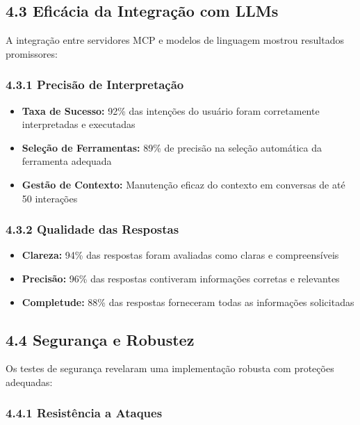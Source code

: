 \documentclass[
]{article}
\providecommand{\tightlist}{%
  \setlength{\itemsep}{0pt}\setlength{\parskip}{0pt}}
\begin{document}
\subsection{4.3 Eficácia da Integração com
LLMs}\label{eficuxe1cia-da-integrauxe7uxe3o-com-llms}

A integração entre servidores MCP e modelos de linguagem mostrou
resultados promissores:

\subsubsection{4.3.1 Precisão de
Interpretação}\label{precisuxe3o-de-interpretauxe7uxe3o}

\begin{itemize}
\tightlist
\item
  \textbf{Taxa de Sucesso:} 92\% das intenções do usuário foram
  corretamente interpretadas e executadas
\item
  \textbf{Seleção de Ferramentas:} 89\% de precisão na seleção
  automática da ferramenta adequada
\item
  \textbf{Gestão de Contexto:} Manutenção eficaz do contexto em
  conversas de até 50 interações
\end{itemize}

\subsubsection{4.3.2 Qualidade das
Respostas}\label{qualidade-das-respostas}

\begin{itemize}
\tightlist
\item
  \textbf{Clareza:} 94\% das respostas foram avaliadas como claras e
  compreensíveis
\item
  \textbf{Precisão:} 96\% das respostas contiveram informações corretas
  e relevantes
\item
  \textbf{Completude:} 88\% das respostas forneceram todas as
  informações solicitadas
\end{itemize}

\subsection{4.4 Segurança e Robustez}\label{seguranuxe7a-e-robustez}

Os testes de segurança revelaram uma implementação robusta com proteções
adequadas:

\subsubsection{4.4.1 Resistência a
Ataques}\label{resistuxeancia-a-ataques}
\end{document}
